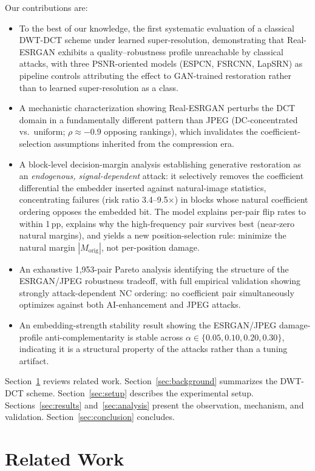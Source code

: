 \documentclass[conference]{IEEEtran}
\begin{document}
Our contributions are:
\begin{itemize}
\item To the best of our knowledge, the first systematic evaluation of
a classical DWT-DCT scheme under learned super-resolution, demonstrating
that Real-ESRGAN exhibits a quality--robustness profile unreachable by
classical attacks, with three PSNR-oriented models (ESPCN, FSRCNN,
LapSRN) as pipeline controls attributing the effect to GAN-trained
restoration rather than to learned super-resolution as a class.
\item A mechanistic characterization showing Real-ESRGAN perturbs the
DCT domain in a fundamentally different pattern than JPEG (DC-concentrated
vs.\ uniform; $\rho \approx -0.9$ opposing rankings), which invalidates
the coefficient-selection assumptions inherited from the compression era.
\item A block-level decision-margin analysis establishing generative
restoration as an \emph{endogenous, signal-dependent} attack: it
selectively removes the coefficient differential the embedder inserted
against natural-image statistics, concentrating failures (risk ratio
3.4--9.5$\times$) in blocks whose natural coefficient ordering opposes
the embedded bit. The model explains per-pair flip rates to within
1\,pp, explains why the high-frequency pair survives best (near-zero
natural margins), and yields a new position-selection rule: minimize the
natural margin $|M_{\mathrm{orig}}|$, not per-position damage.
\item An exhaustive 1,953-pair Pareto analysis identifying the structure
of the ESRGAN/JPEG robustness tradeoff, with full empirical validation
showing strongly attack-dependent NC ordering: no coefficient pair
simultaneously optimizes against both AI-enhancement and JPEG attacks.
\item An embedding-strength stability result showing the ESRGAN/JPEG
damage-profile anti-complementarity is stable across
$\alpha \in \{0.05, 0.10, 0.20, 0.30\}$, indicating it is a structural
property of the attacks rather than a tuning artifact.
\end{itemize}

Section~\ref{sec:related} reviews related work.
Section~\ref{sec:background} summarizes the DWT-DCT scheme.
Section~\ref{sec:setup} describes the experimental setup.
Sections~\ref{sec:results} and~\ref{sec:analysis} present the
observation, mechanism, and validation. Section~\ref{sec:conclusion}
concludes.

\section{Related Work}
\label{sec:related}
\end{document}

